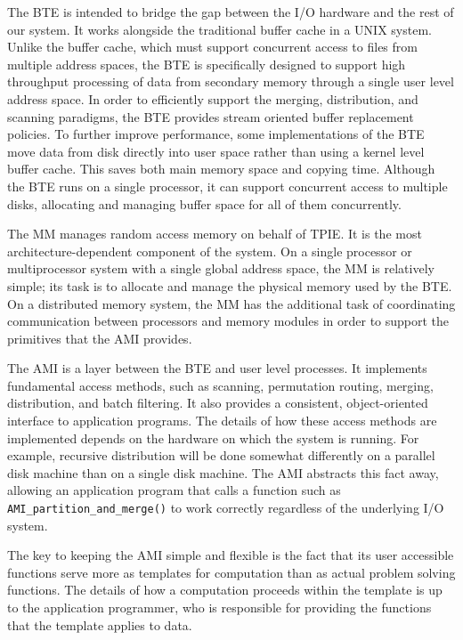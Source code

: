 The BTE is intended to bridge the gap between the I/O hardware and the
rest of our system.  It works alongside the traditional buffer
cache in a UNIX system.  Unlike the buffer
cache, which must support concurrent access to
files from multiple address spaces, the BTE is specifically designed
to support high throughput processing of data from secondary memory
through a single user level address space.  In order to efficiently
support the merging, distribution, and scanning paradigms, the BTE
provides stream oriented buffer replacement policies.  To further
improve performance, some implementations of the BTE move data from
disk directly into user space rather than using a kernel level buffer
cache.  This saves both main memory space and
copying time.  Although the BTE runs on a single processor, it can
support concurrent access to multiple disks,
allocating and managing buffer space for all of them concurrently.

The MM manages random access memory on behalf of
TPIE.  It is the most architecture-dependent component of the system.
On a single processor or multiprocessor system with a single global
address space, the MM is relatively simple; its task is to allocate
and manage the physical memory used by the BTE.  On a distributed
memory system, the MM has the additional task of coordinating
communication between processors and memory modules in order to
support the primitives that the AMI provides.

The AMI is a layer between the BTE and
user level processes.  It implements fundamental access methods, such
as scanning, permutation routing, merging, distribution, and batch
filtering. It also provides a consistent, object-oriented interface to
application programs.  The details of how these access methods are
implemented depends on the hardware on which the system is running.
For example, recursive distribution will be done somewhat differently
on a parallel disk machine than on a single disk machine.  The AMI
abstracts this fact away, allowing an application program that calls a
function such as
\verb|AMI_partition_and_merge()| to work correctly
regardless of the underlying I/O system.

The key to keeping the AMI simple and flexible is the fact that its
user accessible functions serve more as templates for computation than
as actual problem solving functions.  The details of how a computation
proceeds within the template is up to the application programmer, who
is responsible for providing the functions that the template applies
to data.

